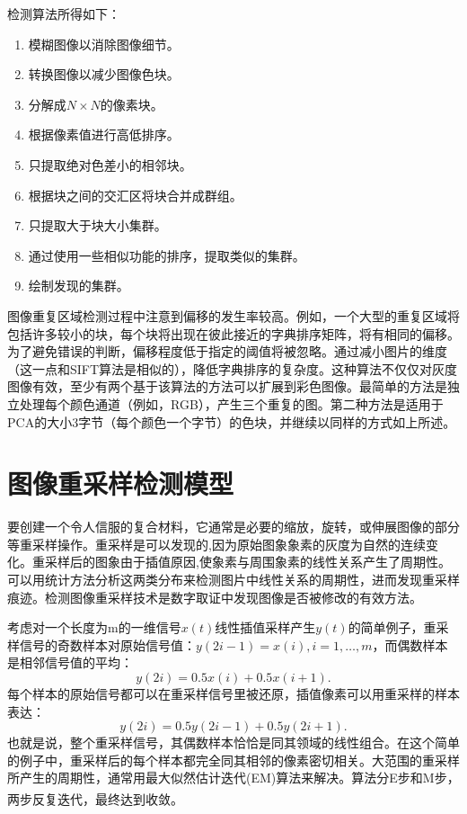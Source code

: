 \documentclass[a4paper, 10pt, notitlepage]{report}
\newcommand{\supercite}[1]{\textsuperscript{\cite{#1}}}
\begin{document}
		检测算法所得如下：
		\begin{enumerate}\setlength{\itemsep}{-0.1cm}
			\item 模糊图像以消除图像细节。
			\item 转换图像以减少图像色块。
			\item 分解成$N \times N$的像素块。
			\item 根据像素值进行高低排序。
			\item 只提取绝对色差小的相邻块。
			\item 根据块之间的交汇区将块合并成群组。
			\item 只提取大于块大小集群。
			\item 通过使用一些相似功能的排序，提取类似的集群。
			\item 绘制发现的集群。
		\end{enumerate}
	
		图像重复区域检测过程中注意到偏移的发生率较高。例如，一个大型的重复区域将包括许多较小的块，每个块将出现在彼此接近的字典排序矩阵，将有相同的偏移。为了避免错误的判断，偏移程度低于指定的阈值将被忽略。通过减小图片的维度（这一点和SIFT算法是相似的），降低字典排序的复杂度。这种算法不仅仅对灰度图像有效，至少有两个基于该算法的方法可以扩展到彩色图像。最简单的方法是独立处理每个颜色通道（例如，RGB），产生三个重复的图。第二种方法是适用于PCA的大小3字节（每个颜色一个字节）的色块，并继续以同样的方式如上所述。

	\section{图像重采样检测模型}
		要创建一个令人信服的复合材料，它通常是必要的缩放，旋转，或伸展图像的部分等重采样操作。重采样是可以发现的,因为原始图象象素的灰度为自然的连续变化。重采样后的图象由于插值原因,使象素与周围象素的线性关系产生了周期性。可以用统计方法分析这两类分布来检测图片中线性关系的周期性，进而发现重采样痕迹。检测图像重采样技术是数字取证中发现图像是否被修改的有效方法。

		考虑对一个长度为m的一维信号$x(t)$线性插值采样产生$y(t)$的简单例子，重采样信号的奇数样本对原始信号值：$y(2i-1)=x(i),i=1,\dots,m$，而偶数样本是相邻信号值的平均：
		\begin{equation}
			y(2i)=0.5x(i)+0.5x(i+1).
		\end{equation}
		每个样本的原始信号都可以在重采样信号里被还原，插值像素可以用重采样的样本表达：
		\begin{equation}
			y(2i)=0.5y(2i-1)+0.5y(2i+1).
		\end{equation}
		也就是说，整个重采样信号，其偶数样本恰恰是同其领域的线性组合。在这个简单的例子中，重采样后的每个样本都完全同其相邻的像素密切相关。大范围的重采样所产生的周期性，通常用最大似然估计迭代(EM)算法来解决。算法分E步和M步，两步反复迭代，最终达到收敛\supercite{duda1995pattern}。
\end{document}

